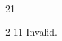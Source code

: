 \documentclass[paper=A4]{ropas-poster}
\begin{document}
\begin{postergrid}{2}{1}
\begin{posterblock}{2-1}{1}
Invalid.
\end{posterblock}
\end{postergrid}
\end{document}
